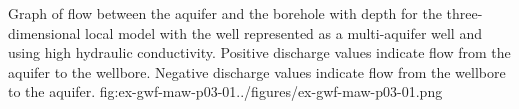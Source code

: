 \begin{StandardFigure}{
                                     Graph of flow between the aquifer and the borehole with depth
                                     for the three-dimensional local model with the well represented as
                                     a multi-aquifer well and using high hydraulic conductivity. Positive 
                                     discharge values indicate flow from the aquifer to the wellbore.
                                     Negative discharge values indicate flow from the wellbore to the
                                     aquifer. 
                                     }{fig:ex-gwf-maw-p03-01}{../figures/ex-gwf-maw-p03-01.png}
\end{StandardFigure}                                 

